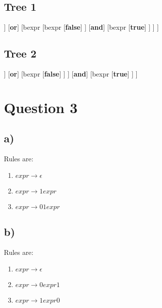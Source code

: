 \documentclass[12pt, A4]{article}
\begin{document}
	\subsection*{Tree 1}
	\begin{forest}
		[bexpr
			[bexpr
				[\textbf{true}]
			]
			[\textbf{or}]
			[bexpr
				[bexpr
					[\textbf{false}]
				]
				[\textbf{and}]
				[bexpr
					[\textbf{true}]
				]
			]
		]
	\end{forest}
	
	\subsection*{Tree 2}
	\begin{forest}
		[bexpr
			[bexpr
				[bexpr
					[\textbf{true}]
				]
				[\textbf{or}]
				[bexpr
					[\textbf{false}]
				]
			]
			[\textbf{and}]
			[bexpr
				[\textbf{true}]
			]
		]
	\end{forest}
	
	\newpage
	\section{Question 3}
	
	\subsection*{a)}
	
	Rules are: \\
	\begin{enumerate}
		\item $expr \rightarrow \epsilon$
		\item $expr \rightarrow 1expr$
		\item $expr \rightarrow 01expr$
	\end{enumerate}
	
	\subsection*{b)}
	
	Rules are: \\
	\begin{enumerate}
		\item $expr \rightarrow \epsilon$
		\item $expr \rightarrow 0expr1$
		\item $expr \rightarrow 1expr0$
	\end{enumerate}
	
\end{document}
